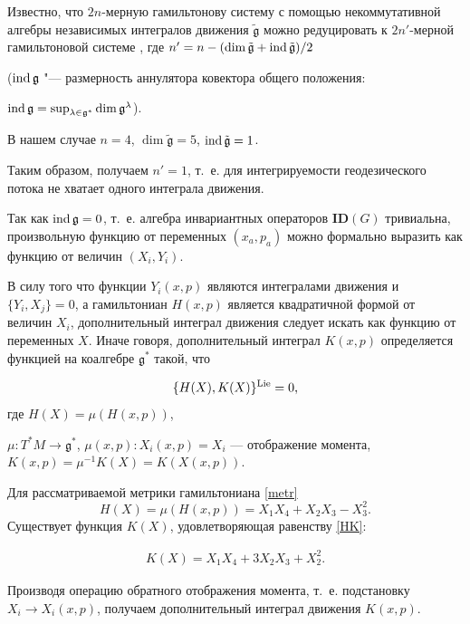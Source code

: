 Известно, что $ 2n $-мерную гамильтонову систему с помощью некоммутативной алгебры независимых интегралов движения $ \tilde{\mathfrak{g}} $ можно редуцировать к $ 2 n' $-мерной гамильтоновой системе \cite{Fomenko}, где $ n'=n-(\dim\tilde{\mathfrak{g}}+\mathop{\rm ind} \tilde{\mathfrak{g}})/2 $ 

($ \mathop{\rm ind}\mathfrak{g} $ "--- размерность аннулятора ковектора общего положения: 

$ \mathop{\rm ind} \mathfrak{g}=\sup_{\lambda\in\mathfrak{g}^\ast}\dim \mathfrak{g}^{\lambda}$). 

В нашем случае $ n=4$, \mbox{$\dim\tilde{\mathfrak{g}}=5$}, $ {\rm ind}\,\tilde{\mathfrak{g}}=1 $. 

Таким образом, получаем $ n'=1 $, т.~е. для интегрируемости геодезического потока не хватает одного интеграла движения.



Так как ${\rm ind}\,\mathfrak{g}=0 $, т.~е. алгебра инвариантных операторов $ \textbf{ID}(G) $ тривиальна, произвольную функцию от переменных $ (x_a,p_a) $ можно формально выразить как функцию от величин $ (X_i,Y_i) $. 

В силу того что функции $ Y_i(x,p) $ являются интегралами движения и $ \{Y_i,X_j\}=0 $, а гамильтониан $ H(x,p) $ является квадратичной формой от величин $ X_i $, дополнительный интеграл движения следует искать как функцию от переменных $ X $. Иначе говоря, дополнительный интеграл $ K(x,p) $ определяется функцией на коалгебре $\mathfrak{g}^\ast$ такой, что 

$$ \{H(X),K(X)\}^{\rm Lie}=0 ,$$ где $ H(X)=\mu ( H(x,p))$,

$\mu: T^*M\to\mathfrak{g}^\ast$, $\mu(x,p): X_i(x,p)=X_i $ --- отображение момента, $ K(x,p)=\mu^{-1}K(X)=K(X(x,p)) $.



Для рассматриваемой метрики гамильтониана \eqref{metr} $$ H(X)=\mu(H(x,p))=X_1X_4+X_2X_3-X_3^2.$$ Существует функция $ K(X) $, удовлетворяющая равенству \eqref{HK}:

\begin{eqnarray}

\label{integral}

K(X)=X_{1}X_{4}+3X_{2}X_{3}+X_{2}^2.

\end{eqnarray}

Производя операцию обратного отображения момента, т.~е. подстановку $ X_i\to X_i(x,p) $, получаем дополнительный интеграл движения $ K(x,p)$.



